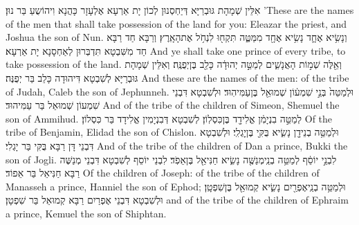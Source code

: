 {אִלֵּין שְׁמָהָת גּוּבְרַיָּא דְּיַחְסְנוּן לְכוֹן יָת אַרְעָא אֶלְעָזָר כָּהֲנָא וִיהוֹשֻעַ בַּר נוּן׃}
{’These are the names of the men that shall take possession of the land for you: Eleazar the priest, and Joshua the son of Nun.}{}
{וְנָשִׂ֥יא אֶחָ֛ד נָשִׂ֥יא אֶחָ֖ד מִמַּטֶּ֑ה תִּקְח֖וּ לִנְחֹ֥ל אֶת\maqqaf הָאָֽרֶץ׃}
{וְרַבָּא חַד רַבָּא חַד מִשִּׁבְטָא תִּדְבְּרוּן לְאַחְסָנָא יָת אַרְעָא׃}
{And ye shall take one prince of every tribe, to take possession of the land.}{}
{וְאֵ֖לֶּה שְׁמ֣וֹת הָאֲנָשִׁ֑ים לְמַטֵּ֣ה יְהוּדָ֔ה כָּלֵ֖ב בֶּן\maqqaf יְפֻנֶּֽה׃}
{וְאִלֵּין שְׁמָהָת גּוּבְרַיָּא לְשִׁבְטָא דִּיהוּדָה כָּלֵב בַּר יְפֻנֶּה׃}
{And these are the names of the men: of the tribe of Judah, Caleb the son of Jephunneh.}{}
{וּלְמַטֵּה֙ בְּנֵ֣י שִׁמְע֔וֹן שְׁמוּאֵ֖ל בֶּן\maqqaf עַמִּיהֽוּד׃}
{וּלְשִׁבְטָא דִּבְנֵי שִׁמְעוֹן שְׁמוּאֵל בַּר עַמִּיהוּד׃}
{And of the tribe of the children of Simeon, Shemuel the son of Ammihud.}{}
{לְמַטֵּ֣ה בִנְיָמִ֔ן אֱלִידָ֖ד בֶּן\maqqaf כִּסְלֽוֹן׃}
{לְשִׁבְטָא דְּבִנְיָמִין אֱלִידָד בַּר כִּסְלוֹן׃}
{Of the tribe of Benjamin, Elidad the son of Chislon.}{}
{וּלְמַטֵּ֥ה בְנֵי\maqqaf דָ֖ן נָשִׂ֑יא בֻּקִּ֖י בֶּן\maqqaf יׇגְלִֽי׃}
{וּלְשִׁבְטָא דִּבְנֵי דָּן רַבָּא בֻּקִּי בַּר יָגְלִי׃}
{And of the tribe of the children of Dan a prince, Bukki the son of Jogli.}{}
{לִבְנֵ֣י יוֹסֵ֔ף לְמַטֵּ֥ה בְנֵֽי\maqqaf מְנַשֶּׁ֖ה נָשִׂ֑יא חַנִּיאֵ֖ל בֶּן\maqqaf אֵפֹֽד׃}
{לִבְנֵי יוֹסֵף לְשִׁבְטָא דִּבְנֵי מְנַשֶּׁה רַבָּא חַנִּיאֵל בַּר אֵפוֹד׃}
{Of the children of Joseph: of the tribe of the children of Manasseh a prince, Hanniel the son of Ephod;}{}
{וּלְמַטֵּ֥ה בְנֵֽי\maqqaf אֶפְרַ֖יִם נָשִׂ֑יא קְמוּאֵ֖ל בֶּן\maqqaf שִׁפְטָֽן׃}
{וּלְשִׁבְטָא דִּבְנֵי אֶפְרַיִם רַבָּא קְמוּאֵל בַּר שִׁפְטָן׃}
{and of the tribe of the children of Ephraim a prince, Kemuel the son of Shiphtan.}{}
